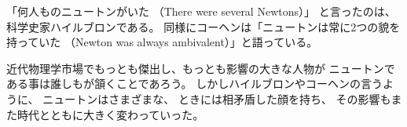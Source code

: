 \documentclass{jlreq}
\begin{document}
「何人ものニュートンがいた （There were several Newtons）」
と言ったのは、科学史家ハイルブロンである。%
同様にコーヘンは「ニュートンは常に2つの貌を持っていた%
（Newton was always ambivalent）」と語っている。

近代物理学市場でもっとも傑出し、もっとも影響の大きな人物が
ニュートンである事は誰しもが頷くことであろう。
しかしハイルブロンやコーヘンの言うように、
ニュートンはさまざまな、%
ときには相矛盾した顔を持ち、
その影響もまた時代とともに大きく変わっていった。
 
\end{document}
